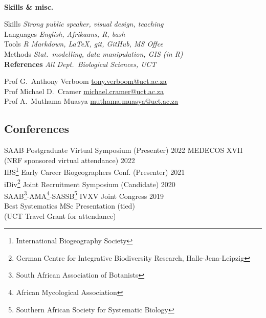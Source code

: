 \documentclass[10pt]{article}
\begin{document}
\begin{multicols}{2}
\

\textbf{Skills \& misc.} %

Skills         \hfill \textit{Strong public speaker, visual design, teaching} \\
Languages      \hfill \textit{                   English, Afrikaans, R, bash} \\
Tools          \hfill \textit{      R Markdown, LaTeX, git, GitHub, MS Offce} \\
Methods        \hfill \textit{Stat.~modelling, data manipulation, GIS (in R)} \\

\textbf{References} %
           \hfill {\small \textmd{\textit{All Dept.~Biological Sciences, UCT}}}%

Prof G.~Anthony Verboom
      \hfill     \href{mailto:tony.verboom@uct.ac.za}{tony.verboom@uct.ac.za} \\
Prof Michael D.~Cramer
      \hfill \href{mailto:michael.cramer@uct.ac.za}{michael.cramer@uct.ac.za} \\
Prof A.~Muthama Muasya
      \hfill \href{mailto:muthama.muasya@uct.ac.za}{muthama.muasya@uct.ac.za} \\

\columnbreak

\subsection*{Conferences} %

SAAB Postgraduate Virtual Symposium {\small (Presenter)} \hfill {\small 2022}                 
MEDECOS XVII {\small (NRF sponsored virtual attendance)} \hfill {\small       2022} \\
IBS\footnote{International
  Biogeography Society} Early Career
  Biogeographers Conf. {\small (Presenter)} \hfill {\small       2021} \\
iDiv\footnote{German Centre for
  Integrative Biodiversity Research,
  Halle-Jena-Leipzig} Joint Recruitment Symposium  {\small (Candidate)} \hfill {\small       2020} \\
SAAB\footnote{South African
  Association of Botanists}-AMA\footnote{African
  Mycological Association}-SASSB\footnote{Southern
  African Society for Systematic Biology} IVXV Joint Congress \hfill {\small 2019} \\
\hspace{2em} {\small Best Systematics MSc Presentation (tied)} \\
\hspace{2em} {\small(UCT Travel Grant for attendance)}


\end{multicols}
\end{document}
